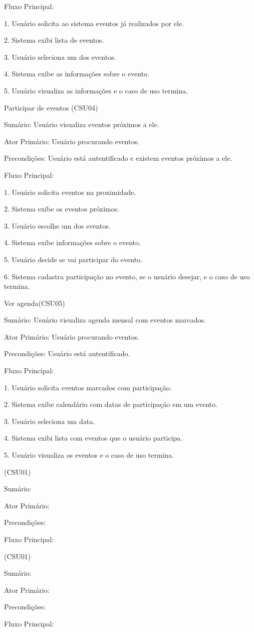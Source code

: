 \documentclass{article}
\begin{document}
	Fluxo Principal:
	
	1. Usuário solicita ao sistema eventos já realizados por ele.
	
	2. Sistema exibi lista de eventos.
	
	3. Usuário seleciona um dos eventos.
	
	4. Sistema exibe as informações sobre o evento.
	
	5. Usuário visualiza as informações e o caso de uso termina.\bigskip
	
	Participar de  eventos (CSU04)
	
	Sumário: Usuário visualiza eventos próximos a ele.
	
	Ator Primário: Usuário procurando eventos.
	
	Precondições: Usuário está autentificado e existem eventos próximos a ele.
	
	Fluxo Principal:
	
	1. Usuário solicita eventos na proximidade.
	
	2. Sistema exibe os eventos próximos.
	
	3. Usuário escolhe um dos eventos.
	
	4. Sistema exibe informações sobre o evento.
	
	5. Usuário decide se vai participar do evento.
	
	6. Sistema cadastra participação no evento, se o usuário desejar, e o caso de uso termina.\bigskip
	
	Ver agenda(CSU05)
	
	Sumário: Usuário visualiza agenda mensal com eventos marcados.
	
	Ator Primário: Usuário procurando eventos.
	
	Precondições: Usuário está autentificado.
	
	Fluxo Principal:
	
	1. Usuário solicita eventos marcados com participação.
	
	2. Sistema exibe calendário com datas de participação em um evento.
	
	3. Usuário seleciona um data.
	
	4. Sistema exibi lista com eventos que o usuário participa.
	
	5. Usuário visualiza os eventos e o caso de uso termina.
	
	 (CSU01)
	
	Sumário: 
	
	Ator Primário: 
	
	Precondições: 
	
	Fluxo Principal:
	
	 (CSU01)
	
	Sumário: 
	
	Ator Primário: 
	
	Precondições: 
	
	Fluxo Principal:
	
	
	
	 

	
	


\begin{easylist}[articletoc]
\end{easylist}
\end{document}
